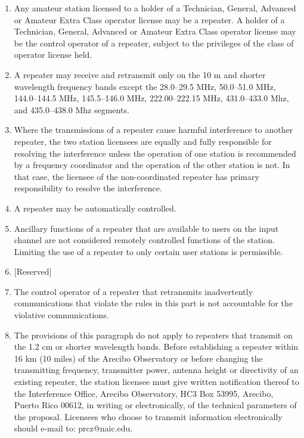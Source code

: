 \documentclass[
  letterpaper,
  DIV=11,
  numbers=noendperiod]{scrreport}
\begin{document}
\begin{enumerate}
\def\labelenumi{(\alph{enumi})}
\item
  Any amateur station licensed to a holder of a Technician, General,
  Advanced or Amateur Extra Class operator license may be a repeater. A
  holder of a Technician, General, Advanced or Amateur Extra Class
  operator license may be the control operator of a repeater, subject to
  the privileges of the class of operator license held.
\item
  A repeater may receive and retransmit only on the 10 m and shorter
  wavelength frequency bands except the 28.0--29.5 MHz, 50.0--51.0 MHz,
  144.0--144.5 MHz, 145.5--146.0 MHz, 222.00--222.15 MHz, 431.0--433.0
  Mhz, and 435.0--438.0 Mhz segments.
\item
  Where the transmissions of a repeater cause harmful interference to
  another repeater, the two station licensees are equally and fully
  responsible for resolving the interference unless the operation of one
  station is recommended by a frequency coordinator and the operation of
  the other station is not. In that case, the licensee of the
  non-coordinated repeater has primary responsibility to resolve the
  interference.
\item
  A repeater may be automatically controlled.
\item
  Ancillary functions of a repeater that are available to users on the
  input channel are not considered remotely controlled functions of the
  station. Limiting the use of a repeater to only certain user stations
  is permissible.
\item
  {[}Reserved{]}
\item
  The control operator of a repeater that retransmits inadvertently
  communications that violate the rules in this part is not accountable
  for the violative communications.
\item
  The provisions of this paragraph do not apply to repeaters that
  transmit on the 1.2 cm or shorter wavelength bands. Before
  establishing a repeater within 16 km (10 miles) of the Arecibo
  Observatory or before changing the transmitting frequency, transmitter
  power, antenna height or directivity of an existing repeater, the
  station licensee must give written notification thereof to the
  Interference Office, Arecibo Observatory, HC3 Box 53995, Arecibo,
  Puerto Rico 00612, in writing or electronically, of the technical
  parameters of the proposal. Licensees who choose to transmit
  information electronically should e-mail to: prcz@naic.edu.
\end{enumerate}
\end{document}
